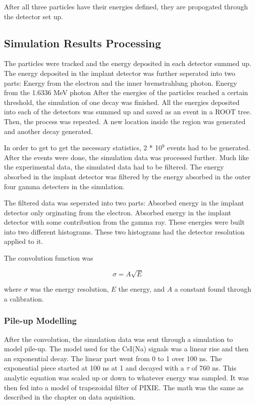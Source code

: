 After all three particles have their energies defined, they are propogated through the detector set up.

\subsection{Simulation Results Processing}
The particles were tracked and the energy deposited in each detector summed up.
The energy deposited in the implant detector was further seperated into two parts:
Energy from the  electron and the inner bremstrahlung photon.
Energy from the 1.6336 MeV photon
After the energies of the particles reached a certain threshold, the simulation of one decay was finished.
All the energies deposited into each of the detectors was summed up and saved as an event in a ROOT tree.
Then, the process was repeated.
A new location inside the region was generated and another decay generated.

In order to get to get the necessary statistics, 2 * 10$^{9}$ events had to be generated. 
After the events were done, the simulation data was processed further. 
Much like the experimental data, the simulated data had to be filtered.
The energy absorbed in the implant detector was filtered by the energy absorbed in the outer four gamma detecters in the simulation.

The filtered data was seperated into two parts:
Absorbed energy in the implant detector only orginating from the electron.
Absorbed energy in the implant detector with some contribution from the gamma ray.
These energies were built into two different histograms.
These two histograms had the detector resolution applied to it. 

The convolution function was

\begin{equation}
	\sigma = A\sqrt{E}
	\label{eq:convo}
\end{equation}

where $\sigma$ was the energy resolution, $E$ the energy, and $A$ a constant found through a calibration.

\subsubsection{Pile-up Modelling}
After the convolution, the simulation data was sent through a simulation to model pile-up.
The model used for the CsI(Na) signals was a linear rise and then an exponential decay.
The linear part went from 0 to 1 over 100 ns. 
The exponential piece started at 100 ns at 1 and decayed with a $\tau$ of 760 ns.
This analytic equation was scaled up or down to whatever energy was sampled.
It was then fed into a model of trapezoidal filter of PIXIE. 
The math was the same as described in the chapter on data aquisition.


